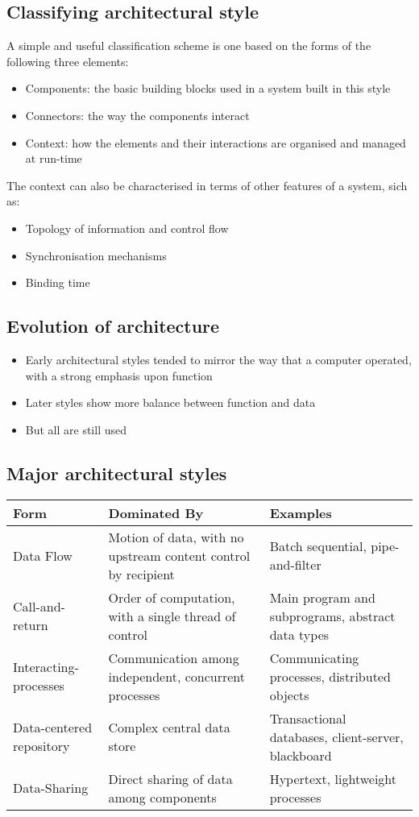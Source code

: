 \documentclass{article}[18pt]
\begin{document}
\subsection{Classifying architectural style}
A simple and useful classification scheme is one based on the forms of the following three elements:
\begin{itemize}
	\item Components: the basic building blocks used in a system built in this style
	\item Connectors: the way the components interact
	\item Context: how the elements and their interactions are organised and managed at run-time
\end{itemize}
The context can also be characterised in terms of other features of a system, sich as:
\begin{itemize}
	\item Topology of information and control flow
	\item Synchronisation mechanisms
	\item Binding time
\end{itemize}
\subsection{Evolution of architecture}
\begin{itemize}
	\item Early architectural styles tended to mirror the way that a computer operated, with a strong emphasis upon function
	\item Later styles show more balance between function and data
	\item But all are still used
\end{itemize}
\subsection{Major architectural styles}
{\renewcommand{\arraystretch}{2}
\begin{tabularx}{\textwidth}{|L|L|L|}
	\hline
	Form & Dominated By & Examples \\
	\hline
	Data Flow & Motion of data, with no upstream content control by recipient & Batch sequential, pipe-and-filter \\
	\hline
	Call-and-return & Order of computation, with a single thread of control & Main program and subprograms, abstract data types \\
	\hline
	Interacting-processes & Communication among independent, concurrent processes & Communicating processes, distributed objects \\
	\hline
	Data-centered repository & Complex central data store & Transactional databases, client-server, blackboard \\
	\hline
	Data-Sharing & Direct sharing of data among components & Hypertext, lightweight processes \\
	\hline
\end{tabularx}}
\end{document}
